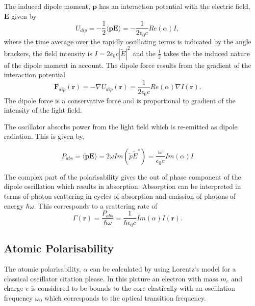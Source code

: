 The induced dipole moment, $\boldsymbol p$ has an interaction potential with the electric field, $\boldsymbol E$ given by
\begin{equation}\label{eq:interaction_pot}
U_{dip} = - \frac{1}{2} \langle \boldsymbol{pE} \rangle = - \frac{1}{2 \epsilon_0 c} Re(\alpha)I,
\end{equation}
where the time average over the rapidly oscillating terms is indicated by the angle brackers, the field intensity is $I=2\epsilon_0 c |\tilde E|^2$ and the $\frac{1}{2}$ takes the the induced nature of the dipole moment in account. The dipole force results from the gradient of the interaction potential
\begin{equation}\label{eq:dipole_force}
\boldsymbol F_{dip}(\boldsymbol r ) = - \nabla U_{dip}(\boldsymbol r) = \frac{1}{2 \epsilon_0 c} Re(\alpha) \nabla I(\boldsymbol r).
\end{equation}
The dipole force is a conservative force and is proportional to gradient of the intensity of the light field.

The oscillator absorbs power from the light field which is re-emitted as dipole radiation. This is given by,

\begin{equation}\label{eq:power_absorbed}
P_{abs} = \langle \boldsymbol{\dot p E} \rangle = 2 \omega Im(\tilde p \tilde E^*) = \frac{\omega}{\epsilon_0 c} Im (\alpha) I
\end{equation}

The complex part of the polarisability gives the out of phase component of the dipole oscillation which results in absorption. Absorption can be interpreted in terms of photon scattering in cycles of absorption and emission of photons of energy $\hbar \omega$. This corresponds to a scattering rate of
\begin{equation}\label{eq:scattering_rate}
\Gamma(\boldsymbol r) = \frac{P_{abs}}{\hbar \omega} = \frac{1}{\hbar \epsilon_0 c} Im(\alpha) I(\boldsymbol r).
\end{equation}

\subsection{Atomic Polarisability}

The atomic polarisability, $\alpha$ can be calculated by using Lorentz's model for a classical oscillator {\color{red} citation please}. In this picture an electron with mass $m_e$ and charge $e$ is considered to be bounds to the core elastically with an oscillation frequency $\omega_0$ which corresponds to the optical transition frequency.


